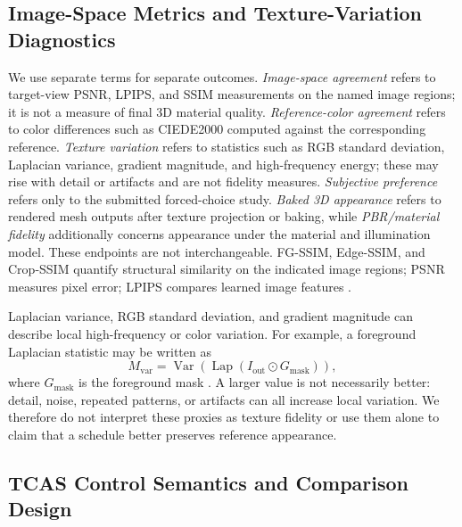 \documentclass[times,twocolumn,final]{elsarticle}
\providecommand{\DIFadd}[1]{{\protect\color{blue} \sf #1}} %
\providecommand{\DIFaddbegin}{} %
\providecommand{\DIFaddend}{} %
\begin{document}
  \DIFaddbegin \subsection{Image-Space Metrics and Texture-Variation Diagnostics}
\DIFaddend \label{subsec:metrics}

  \DIFaddbegin \DIFadd{We use separate terms for separate outcomes. \emph{Image-space agreement} refers to target-view PSNR, LPIPS, and SSIM measurements on the named image regions; it is not a measure of final 3D material quality. \emph{Reference-color agreement} refers to color differences such as CIEDE2000 computed against the corresponding reference. \emph{Texture variation} refers to statistics such as RGB standard deviation, Laplacian variance, gradient magnitude, and high-frequency energy; these may rise with detail or artifacts and are not fidelity measures. \emph{Subjective preference} refers only to the submitted forced-choice study. \emph{Baked 3D appearance} refers to rendered mesh outputs after texture projection or baking, while \emph{PBR/material fidelity} additionally concerns appearance under the material and illumination model. These endpoints are not interchangeable. FG-SSIM, Edge-SSIM, and }\DIFaddend Crop-SSIM   \DIFaddbegin \DIFadd{quantify structural similarity on the indicated image regions; PSNR measures pixel error; LPIPS compares learned image features \cite{wang2004ssim,zhang2018lpips}.
}

\DIFaddend Laplacian variance, RGB standard deviation, and gradient magnitude   \DIFaddbegin \DIFadd{can describe local }\DIFaddend high-frequency  
 \DIFaddbegin \DIFadd{or color variation. For example, a foreground Laplacian statistic may be written as
}\begin{equation}
M_{\mathrm{var}}=\operatorname{Var}\!\left(\operatorname{Lap}(I_{\mathrm{out}}\odot G_{\mathrm{mask}})\right),
\end{equation}\DIFaddend 
where   \DIFaddbegin \DIFadd{$G_{\mathrm{mask}}$ is }\DIFaddend the foreground mask  . A larger   \DIFaddbegin \DIFadd{value is not necessarily better: detail, noise, repeated patterns, or artifacts can all increase local variation. We therefore do not interpret these proxies as texture fidelity or use them alone to claim that a schedule better preserves reference appearance}\DIFaddend .

  \DIFaddbegin \subsection{TCAS Control Semantics and Comparison Design}
\DIFaddend \label{subsec:tcas}
\end{document}
